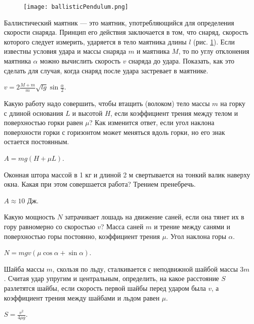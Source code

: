 \begin{figure}
\centering
\texttt{[image: ballisticPendulum.png]}
\caption{}
\label{ballisticPendulum}
\end{figure}

\begin{ex} %
Баллистический маятник — это маятник, употребляющийся для определения скорости снаряда. Принцип его действия заключается в том, что снаряд, скорость которого следует измерить, ударяется в тело маятника длины $l$ (рис. \ref{ballisticPendulum}). Если известны условия удара и массы снаряда $m$ и маятника $M$, то по углу отклонения маятника $\alpha$ можно вычислить скорость $v$ снаряда до удара. Показать, как это сделать для случая, когда снаряд после удара застревает в маятнике.
\begin{ans}
$v = 2\frac{M+m}{m}\sqrt{lg}\sin \frac{\alpha}{2}$.
\end{ans}
\end{ex}

\begin{ex} %
Какую работу надо совершить, чтобы втащить (волоком) тело массы $m$ на горку с длиной основания $L$ и высотой $H$, если коэффициент трения между телом и поверхностью горки равен $\mu$? Как изменится ответ, если угол наклона поверхности горки с горизонтом может меняться вдоль горки, но его знак остается постоянным.
\begin{ans}
$A=mg(H+\mu L)$.
\end{ans}
\end{ex}

\begin{ex}
Оконная штора массой в 1 кг и длиной 2 м свертывается на тонкий валик наверху окна. Какая при этом совершается работа? Трением пренебречь.
\begin{ans}
$A \approx 10$ Дж.
\end{ans}
\end{ex}

\begin{ex} %
Какую мощность $N$ затрачивает лошадь на движение саней, если она тянет их в гору равномерно со скоростью $v$? Масса саней $m$ и трение между санями и поверхностью горы постоянно, коэффициент трения $\mu$. Угол наклона горы $\alpha$.
\begin{ans}
$N = mgv(\mu \cos \alpha +\sin \alpha)$.
\end{ans}
\end{ex}

\begin{ex} %
Шайба массы $m$, скользя по льду, сталкивается с неподвижной шайбой массы $3m$. Считая удар упругим и центральным, определить, на какое расстояние $S$ разлетятся шайбы, если скорость первой шайбы перед ударом была $v$, а коэффициент трения между шайбами и льдом равен $\mu$.
\begin{ans}
$S = \frac{v^2}{4 \mu g}$.
\end{ans}
\end{ex}

